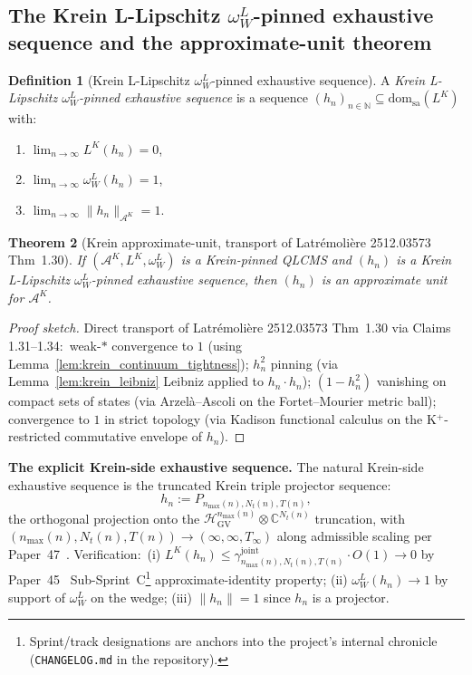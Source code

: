 \documentclass[11pt,a4paper]{article}
\theoremstyle{plain}
\newtheorem{theorem}{Theorem}[section]
\theoremstyle{definition}
\newtheorem{definition}[theorem]{Definition}
\newcommand{\nmax}{n_{\max}}
\newcommand{\Nt}{N_{t}}
\newcommand{\Acal}{\mathcal{A}}
\newcommand{\norm}[1]{\lVert #1 \rVert}
\newcommand{\C}{\mathbb{C}}
\newcommand{\N}{\mathbb{N}}
\newcommand{\HGV}{\mathcal{H}_{\mathrm{GV}}}
\newcommand{\gammajoint}{\gamma^{\mathrm{joint}}}
\newcommand{\BWvac}{\omega_{W}^{L}}
\begin{document}
\subsection{The Krein L-Lipschitz $\BWvac$-pinned exhaustive sequence
and the approximate-unit theorem}\label{sec:krein_exhaustive_approx_unit}

\begin{definition}[Krein L-Lipschitz $\BWvac$-pinned exhaustive
sequence]\label{def:krein_exhaustive}
A \emph{Krein L-Lipschitz $\BWvac$-pinned exhaustive sequence}
is a sequence $(h_{n})_{n \in \N} \subseteq \mathrm{dom}_{\mathrm{sa}}(L^{K})$
with:
\begin{enumerate}
\item $\lim_{n\to\infty} L^{K}(h_{n}) = 0$,
\item $\lim_{n\to\infty} \BWvac(h_{n}) = 1$,
\item $\lim_{n\to\infty} \norm{h_{n}}_{\Acal^{K}} = 1$.
\end{enumerate}
\end{definition}

\begin{theorem}[Krein approximate-unit, transport of
Latr\'emoli\`ere 2512.03573 Thm~1.30]\label{thm:krein_approx_unit}
If $(\Acal^{K}, L^{K}, \BWvac)$ is a Krein-pinned QLCMS and
$(h_{n})$ is a Krein L-Lipschitz $\BWvac$-pinned exhaustive sequence,
then $(h_{n})$ is an approximate unit for $\Acal^{K}$.
\end{theorem}

\begin{proof}[Proof sketch]
Direct transport of Latr\'emoli\`ere 2512.03573 Thm~1.30 via Claims
1.31--1.34:\ weak-$*$ convergence to $1$ (using
Lemma~\ref{lem:krein_continuum_tightness}); $h_{n}^{2}$ pinning (via
Lemma~\ref{lem:krein_leibniz} Leibniz applied to $h_{n}\cdot h_{n}$);
$(1 - h_{n}^{2})$ vanishing on compact sets of states (via
Arzel\`a--Ascoli on the Fortet--Mourier metric ball); convergence to
$1$ in strict topology (via Kadison functional calculus on the
K$^{+}$-restricted commutative envelope of $h_{n}$).
\end{proof}

\textbf{The explicit Krein-side exhaustive sequence.} The natural
Krein-side exhaustive sequence is the truncated Krein triple
projector sequence:\
\[
h_{n} := P_{\nmax(n), \Nt(n), T(n)},
\]
the orthogonal projection onto the $\HGV^{\nmax(n)} \otimes \C^{\Nt(n)}$
truncation, with $(\nmax(n), \Nt(n), T(n)) \to (\infty, \infty, T_{\infty})$
along admissible scaling per Paper~47~\cite{paper47}. Verification:\
(i) $L^{K}(h_{n}) \le \gammajoint_{\nmax(n), \Nt(n), T(n)} \cdot O(1) \to 0$
by Paper~45~\cite{paper45} Sub-Sprint~C\footnote{Sprint/track designations are anchors into the project's internal chronicle (\texttt{CHANGELOG.md} in the repository).} approximate-identity property;
(ii) $\BWvac(h_{n}) \to 1$ by support of $\BWvac$ on the wedge;
(iii) $\norm{h_{n}} = 1$ since $h_{n}$ is a projector.
\end{document}

